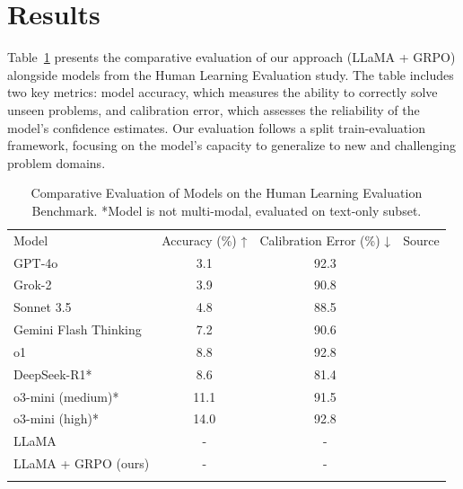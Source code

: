 \documentclass{svproc}
\begin{document}


\section{Results}

Table~\ref{tab:results} presents the comparative evaluation of our approach (LLaMA + GRPO) alongside models from the Human Learning Evaluation study. The table includes two key metrics: model accuracy, which measures the ability to correctly solve unseen problems, and calibration error, which assesses the reliability of the model’s confidence estimates. Our evaluation follows a split train-evaluation framework, focusing on the model’s capacity to generalize to new and challenging problem domains.

\begin{table}[h]
\centering
\begin{tabular}{lccc}
Model                   & Accuracy (\%) ↑ & Calibration Error (\%) ↓ & Source \\
GPT-4o                  & 3.1             & 92.3                      & \cite{phan2025humanitysexam} \\
Grok-2                  & 3.9             & 90.8                      & \cite{phan2025humanitysexam} \\
Sonnet 3.5              & 4.8             & 88.5                      & \cite{phan2025humanitysexam} \\
Gemini Flash Thinking   & 7.2             & 90.6                      & \cite{phan2025humanitysexam} \\
o1                      & 8.8             & 92.8                      & \cite{phan2025humanitysexam} \\
DeepSeek-R1*            & 8.6             & 81.4                      & \cite{phan2025humanitysexam} \\
o3-mini (medium)*       & 11.1            & 91.5                      & \cite{phan2025humanitysexam} \\
o3-mini (high)*         & 14.0            & 92.8                      & \cite{phan2025humanitysexam} \\
LLaMA                   & -               & -                         &  \\
LLaMA + GRPO (ours)     & -               & -                         &  \\
\\
\end{tabular}
\caption{
  Comparative Evaluation of Models on the Human Learning Evaluation Benchmark.
  *Model is not multi-modal, evaluated on text-only subset.
  }
  \label{tab:results}
\end{table}
\end{document}
